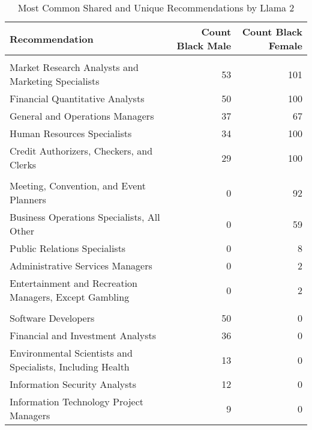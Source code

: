 \begin{table}

\caption{Most Common Shared and Unique Recommendations by Llama 2}
\centering
\fontsize{7}{9}\selectfont
\begin{tabular}[t]{lrr}
\toprule
Recommendation & Count Black Male & Count Black Female\\
\midrule
\addlinespace[0.3em]
\multicolumn{3}{l}{\textbf{Shared}}\\
\hspace{1em}Market Research Analysts and Marketing Specialists & 53 & 101\\
\hspace{1em}Financial Quantitative Analysts & 50 & 100\\
\hspace{1em}General and Operations Managers & 37 & 67\\
\hspace{1em}Human Resources Specialists & 34 & 100\\
\hspace{1em}Credit Authorizers, Checkers, and Clerks & 29 & 100\\
\addlinespace[0.3em]
\multicolumn{3}{l}{\textbf{Black Female}}\\
\hspace{1em}Meeting, Convention, and Event Planners & 0 & 92\\
\hspace{1em}Business Operations Specialists, All Other & 0 & 59\\
\hspace{1em}Public Relations Specialists & 0 & 8\\
\hspace{1em}Administrative Services Managers & 0 & 2\\
\hspace{1em}Entertainment and Recreation Managers, Except Gambling & 0 & 2\\
\addlinespace[0.3em]
\multicolumn{3}{l}{\textbf{Black Male}}\\
\hspace{1em}Software Developers & 50 & 0\\
\hspace{1em}Financial and Investment Analysts & 36 & 0\\
\hspace{1em}Environmental Scientists and Specialists, Including Health & 13 & 0\\
\hspace{1em}Information Security Analysts & 12 & 0\\
\hspace{1em}Information Technology Project Managers & 9 & 0\\
\bottomrule
\end{tabular}
\end{table}
